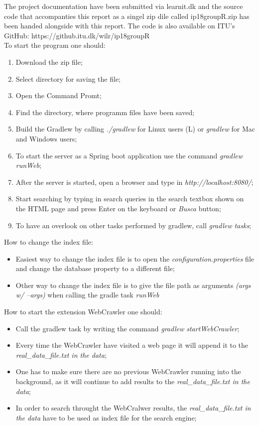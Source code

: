 The project documentation have been submitted via learnit.dk and the source code that accompanties this report as a singel zip dile called ip18groupR.zip has been handed alongside with this report.
The code is also available on ITU's GitHub: https://github.itu.dk/wilr/ip18groupR\\
To start the program one should:
\begin{enumerate}
    \item Download the zip file;
    \item Select directory for saving the file;
    \item Open the Command Promt;
    \item Find the directory, where programm files have been saved;
    \item Build the Gradlew by calling  \textit{./gradlew} for Linux users (L) or \textit{gradlew} for Mac and Windows users;
    \item To start the server as a  Spring boot application use the command \textit{gradlew runWeb};
    \item After the server is started, open a browser and type in \textit{http://localhost:8080/};
    \item Start searching by typing in search queries in the search textbox shown on the HTML page and press Enter on the keyboard or \textit{Busca} button;
    \item To have an overlook on other tasks performed by gradlew, call \textit{gradlew tasks};
\end{enumerate}

How to change the index file:
\begin{itemize}
    \item Easiest way to change the index file is to open the \textit{configuration.properties} file and change the database property to a different file;
    \item Other way to change the index file is to give the file path as arguments \textit{(args w/ --args)} when calling the gradle task \textit{runWeb}
\end{itemize}

How to start the extension WebCrawler one should:
\begin{itemize}

    \item Call the gradlew task by writing the command  \textit{gradlew startWebCrawler};
    \item Every time the WebCrawler have visited a web page it will append it to the \textit{real\_data\_file.txt in the data};
\item One has to make sure there are no previous WebCrawler running into the background, as it will continue to add results to the \textit{real\_data\_file.txt in the data};
\item In order to search throught the WebCralwer results, the \textit{real\_data\_file.txt in the data} have to be used as index file for the search engine;

\end{itemize}

